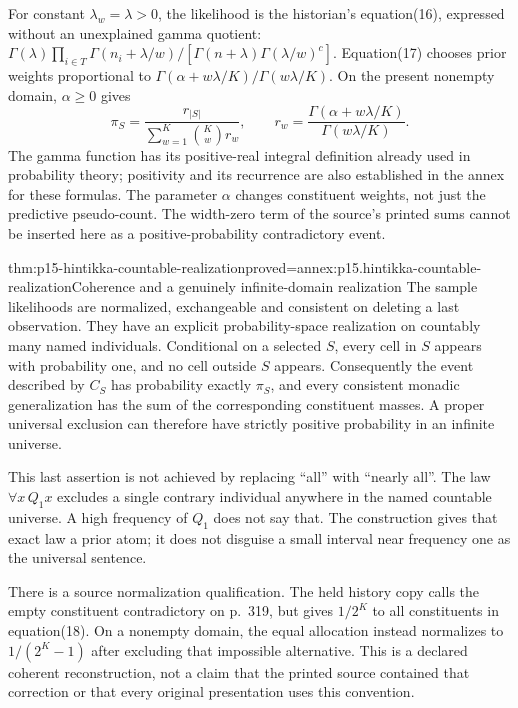 For constant \(\lambda_w=\lambda>0\), the likelihood is the
historian's equation(16), expressed without an unexplained gamma quotient:
\(\Gamma(\lambda)\prod_{i\in T}\Gamma(n_i+\lambda/w)/
[\Gamma(n+\lambda)\Gamma(\lambda/w)^c]\).
Equation(17) chooses prior weights proportional to
\(\Gamma(\alpha+w\lambda/K)/\Gamma(w\lambda/K)\).
On the present nonempty domain, \(\alpha\geq0\) gives
\[
 \pi_S=\frac{r_{|S|}}{\sum_{w=1}^K\binom Kw r_w},\qquad
 r_w=\frac{\Gamma(\alpha+w\lambda/K)}{\Gamma(w\lambda/K)}.
\]
The gamma function has its positive-real integral definition already
used in probability theory; positivity and its recurrence are also
established in the annex for these formulas. The parameter \(\alpha\)
changes constituent weights, not just the predictive pseudo-count.
The width-zero term of the source's printed sums cannot be inserted
here as a positive-probability contradictory event.

\begin{hbtheorem}{thm:p15-hintikka-countable-realization}{proved=annex:p15.hintikka-countable-realization}{Coherence and a genuinely infinite-domain realization}
The sample likelihoods are normalized, exchangeable and consistent on
deleting a last observation. They have an explicit probability-space
realization on countably many named individuals. Conditional on a
selected \(S\), every cell in \(S\) appears with probability one,
and no cell outside \(S\) appears. Consequently the event described
by \(C_S\) has probability exactly \(\pi_S\), and every
consistent monadic generalization has the sum of the corresponding
constituent masses. A proper universal exclusion can therefore have
strictly positive probability in an infinite universe.
\end{hbtheorem}

This last assertion is not achieved by replacing ``all'' with ``nearly
all''. The law \(\forall x\,Q_1x\) excludes a single contrary
individual anywhere in the named countable universe. A high frequency
of \(Q_1\) does not say that. The construction gives that exact law
a prior atom; it does not disguise a small interval near frequency one
as the universal sentence.

There is a source normalization qualification. The held history copy
calls the empty constituent contradictory on p.~319, but gives
\(1/2^K\) to all constituents in equation(18). On a nonempty domain,
the equal allocation instead normalizes to \(1/(2^K-1)\) after
excluding that impossible alternative. This is a declared coherent
reconstruction, not a claim that the printed source contained that
correction or that every original presentation uses this convention.

